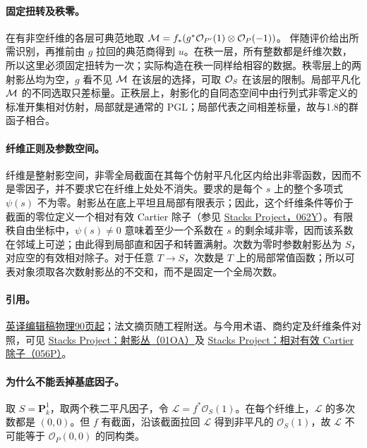\paragraph{固定扭转及秩零。}
在有非空纤维的各层可典范地取
\(\MM=f_*(g^*\OO_{P'}(1)\otimes\OO_P(-1))\)。
伴随评价给出所需识别，再推前由 \(g\) 拉回的典范商得到 \(u\)。在秩一层，所有整数都是纤维次数，所以这里必须固定扭转为一次；实际构造在秩一同样给相容的数据。秩零层上的两射影丛均为空，\(g\) 看不见 \(\MM\) 在该层的选择，可取 \(\OO_S\) 在该层的限制。局部平凡化 \(\MM\) 的不同选取只差标量。正秩层上，射影化的自同态空间中由行列式非零定义的标准开集相对仿射，局部就是通常的 \(\mathrm{PGL}\)；局部代表之间相差标量，故与1.8的群函子相合。

\paragraph{纤维正则及参数空间。}
纤维是整射影空间，非零全局截面在其每个仿射平凡化区内给出非零函数，因而不是零因子，并不要求它在纤维上处处不消失。要求的是每个 \(s\) 上的整个多项式 \(\psi(s)\) 不为零。射影丛在底上平坦且局部有限表示；因此，这个纤维条件等价于截面的零位定义一个相对有效 Cartier 除子（参见 \href{https://stacks.math.columbia.edu/tag/062Y}{Stacks Project，062Y}）。有限秩自由坐标中，\(\psi(s)\ne0\) 意味着至少一个系数在 \(s\) 的剩余域非零，因而该系数在邻域上可逆；由此得到局部直和因子和转置满射。次数为零时参数射影丛为 \(S\)，对应空的有效相对除子。对于任意 \(T\to S\)，次数是 \(T\) 上的局部常值函数；所以可表对象须取各次数射影丛的不交和，而不是固定一个全局次数。

\paragraph{引用。}
\href{https://webusers.imj-prg.fr/~leila.schneps/grothendieckcircle/EGA/EGA5trans.pdf#page=90}{英译编辑稿物理90页起}；法文摘页随工程附送。与今用术语、商约定及纤维条件对照，可见
\href{https://stacks.math.columbia.edu/tag/01OA}{Stacks Project：射影丛（01OA）}及
\href{https://stacks.math.columbia.edu/tag/056P}{Stacks Project：相对有效 Cartier 除子（056P）}。
\par\endgroup

\begingroup
\def\OO{\mathcal O}
\def\LL{\mathcal L}
\def\MM{\mathcal M}
\def\EE{\mathcal E}
\def\nn{\boldsymbol n}
\def\Pic{\operatorname{Pic}}
\def\Sym{\operatorname{Sym}}
\def\Div{\operatorname{Div}}
\hypertarget{audit:L18-075}{}
\paragraph{为什么不能丢掉基底因子。}
取 \(S=\mathbf P_k^1\)，取两个秩二平凡因子，令 \(\LL=f^*\OO_S(1)\)。在每个纤维上，\(\LL\) 的多次数都是 \((0,0)\)。但 \(f\) 有截面，沿该截面拉回 \(\LL\) 得到非平凡的 \(\OO_S(1)\)，故 \(\LL\) 不可能等于 \(\OO_P(0,0)\) 的同构类。

